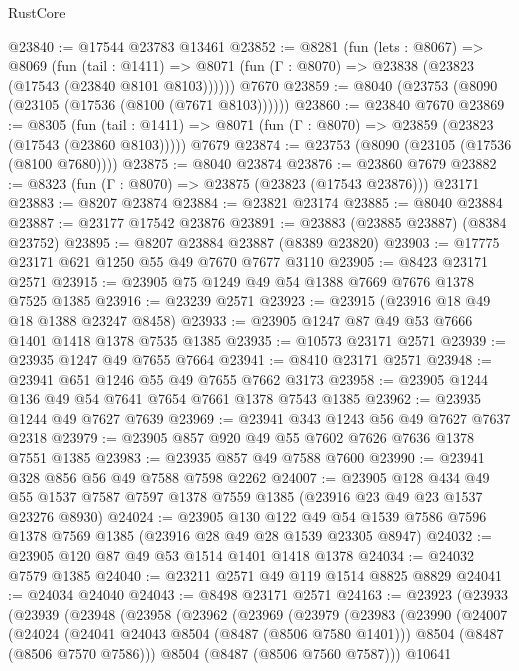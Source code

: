 \begin{lexlean}{RustCore}
\begin{coremodule}
@23840 := @17544 @23783 @13461
@23852 := @8281
    (fun (lets : @8067) =>
    @8069
      (fun (tail : @1411) =>
      @8071 (fun (Γ : @8070) => @23838 (@23823 (@17543 (@23840 @8101 @8103))))))
    @7670
@23859 := @8040 (@23753 (@8090 (@23105 (@17536 (@8100 (@7671 @8103))))))
@23860 := @23840 @7670
@23869 := @8305
    (fun (tail : @1411) => @8071 (fun (Γ : @8070) => @23859 (@23823 (@17543 (@23860 @8103)))))
    @7679
@23874 := @23753 (@8090 (@23105 (@17536 (@8100 @7680))))
@23875 := @8040 @23874
@23876 := @23860 @7679
@23882 := @8323 (fun (Γ : @8070) => @23875 (@23823 (@17543 @23876))) @23171
@23883 := @8207 @23874
@23884 := @23821 @23174
@23885 := @8040 @23884
@23887 := @23177 @17542 @23876
@23891 := @23883 (@23885 @23887) (@8384 @23752)
@23895 := @8207 @23884 @23887 (@8389 @23820)
@23903 := @17775 @23171 @621 @1250 @55 @49 @7670 @7677 @3110
@23905 := @8423 @23171 @2571
@23915 := @23905 @75 @1249 @49 @54 @1388 @7669 @7676 @1378 @7525 @1385
@23916 := @23239 @2571
@23923 := @23915 (@23916 @18 @49 @18 @1388 @23247 @8458)
@23933 := @23905 @1247 @87 @49 @53 @7666 @1401 @1418 @1378 @7535 @1385
@23935 := @10573 @23171 @2571
@23939 := @23935 @1247 @49 @7655 @7664
@23941 := @8410 @23171 @2571
@23948 := @23941 @651 @1246 @55 @49 @7655 @7662 @3173
@23958 := @23905 @1244 @136 @49 @54 @7641 @7654 @7661 @1378 @7543 @1385
@23962 := @23935 @1244 @49 @7627 @7639
@23969 := @23941 @343 @1243 @56 @49 @7627 @7637 @2318
@23979 := @23905 @857 @920 @49 @55 @7602 @7626 @7636 @1378 @7551 @1385
@23983 := @23935 @857 @49 @7588 @7600
@23990 := @23941 @328 @856 @56 @49 @7588 @7598 @2262
@24007 := @23905
    @128
    @434
    @49
    @55
    @1537
    @7587
    @7597
    @1378
    @7559
    @1385
    (@23916 @23 @49 @23 @1537 @23276 @8930)
@24024 := @23905
    @130
    @122
    @49
    @54
    @1539
    @7586
    @7596
    @1378
    @7569
    @1385
    (@23916 @28 @49 @28 @1539 @23305 @8947)
@24032 := @23905 @120 @87 @49 @53 @1514 @1401 @1418 @1378
@24034 := @24032 @7579 @1385
@24040 := @23211 @2571 @49 @119 @1514 @8825 @8829
@24041 := @24034 @24040
@24043 := @8498 @23171 @2571
@24163 := @23923
    (@23933
      (@23939
        (@23948
          (@23958
            (@23962
              (@23969
                (@23979
                  (@23983
                    (@23990
                      (@24007
                        (@24024
                          (@24041 @24043 @8504 (@8487 (@8506 @7580 @1401)))
                          @8504
                          (@8487 (@8506 @7570 @7586)))
                        @8504
                        (@8487 (@8506 @7560 @7587)))
                      @10641

\end{coremodule}
\end{lexlean}
